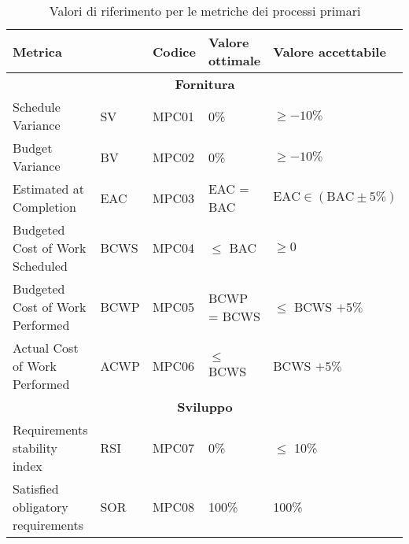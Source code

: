 \begin{table}[H]
	\centering
	\begin{tabularx}{\textwidth}{p{3.5cm}|X|X|l|l}
		\hline
		\multicolumn{2}{l|}{\textbf{Metrica}} & \textbf{Codice} & \textbf{Valore ottimale} & \textbf{Valore accettabile}                                         \\
		\hline
		\multicolumn{5}{c}{\textbf{Fornitura}}                                                                                                                   \\
		\hline
		Schedule Variance                     & SV              & MPC01                    & 0\%                         & $\ge -10\%$                           \\
		Budget Variance                       & BV              & MPC02                    & 0\%                         & $\ge -10\%$                           \\
		Estimated at Completion               & EAC             & MPC03                    & EAC = BAC                   & $\text{EAC} \in (\text{BAC} \pm 5\%)$ \\
		Budgeted Cost of Work Scheduled       & BCWS            & MPC04                    & $\le$ BAC                   & $\ge 0$                               \\
		Budgeted Cost of Work Performed       & BCWP            & MPC05                    & BCWP = BCWS                 & $\le$ BCWS $+ 5\%$                    \\
		Actual Cost of Work Performed         & ACWP            & MPC06                    & $\le$ BCWS                  & BCWS $+ 5\%$                          \\
		\hline
		\multicolumn{5}{c}{\textbf{Sviluppo}}                                                                                                                    \\
		\hline
		Requirements stability index          & RSI             & MPC07                    & 0\%                       	& $\le$ 10\%                            \\
		Satisfied obligatory requirements     & SOR             & MPC08                    & 100\%                       & 100\%                                 \\
		\hline
	\end{tabularx}
	\caption{Valori di riferimento per le metriche dei processi primari}
\end{table}


